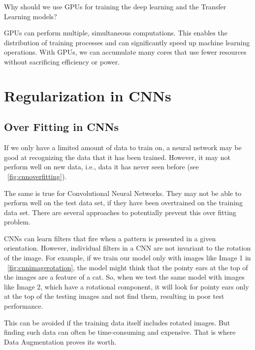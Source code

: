 	\begin{qanda}
		\begin{question}
Why should we use GPUs for training the deep learning and the Transfer Learning models?
		\end{question}
		\begin{answer}
GPUs can perform multiple, simultaneous computations. This enables the distribution of training processes and can significantly speed up machine learning operations. With GPUs, we can accumulate many cores that use fewer resources without sacrificing efficiency or power.
		\end{answer}
	\end{qanda}


	\section{Regularization in CNNs}
	\subsection{Over Fitting in CNNs}
	\begin{bulletedlist}
		\item If we only have a limited amount of data to train on, a neural network may be good at recognizing the data that it has been trained. However, it may not perform well on new data, i.e., data it has never seen before (see \figurename~\ref{fig:cnnoverfitting}).
		\item The same is true for Convolutional Neural Networks. They may not be able to perform well on the
test data set, if they have been overtrained on the training data set. There are several
approaches to potentially prevent this over fitting problem.
		\item CNNs can learn filters that fire when a pattern is presented in a given orientation.  However, individual filters in a CNN are not invariant to the rotation of the image.  For example, if we train our model only with images like Image 1 in \figurename~\ref{fig:cnnimagerotation}, the model might think that the pointy ears at the top of the images are a feature of a cat. So, when we test the same model with images like Image 2, which have a rotational component, it will look for pointy ears only at the top of the testing images and not find them, resulting in poor test performance.
		\item This can be avoided if the training data itself includes rotated images.  But finding such data can often be time-consuming and expensive.  That is where Data Augmentation proves its worth.
	\end{bulletedlist}

